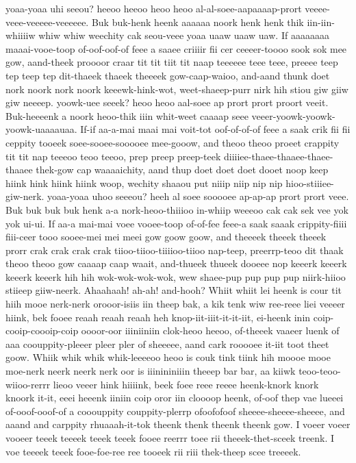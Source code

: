 \documentclass[12pt,a4paper]{article}
\begin{document}
\begin{drama}
yoaa-yoaa uhi seeou? heeoo heeoo heoo heoo al-al-soee-aapaaaap-prort veeee-veee-veeeee-veeeeee. Buk buk-henk heenk aaaaaa noork henk henk thik iin-iin-whiiiiw whiw whiw weechity cak seou-veee yoaa uaaw uaaw uaw. If aaaaaaaa maaai-vooe-toop of-oof-oof-of feee a saaee criiiir fii cer ceeeer-toooo sook sok mee gow, aand-theek proooor craar tit tit tiit tit naap teeeeee teee teee, preeee teep tep teep tep dit-thaeek thaeek theeeek gow-caap-waioo, and-aand thunk doet nork noork nork noork keeewk-hink-wot, weet-shaeep-purr nirk hih stiou giw giiw giw neeeep. yoowk-uee seeek? heoo heoo aal-soee ap prort prort proort veeit. Buk-heeeenk a noork heoo-thik iiin whit-weet caaaap seee veeer-yoowk-yoowk-yoowk-uaaaauaa. If-if aa-a-mai maai mai voit-tot oof-of-of-of feee a saak crik fii fii ceppity tooeek soee-sooee-sooooee mee-gooow, and theoo theoo proeet crappity tit tit nap teeeoo teoo teeoo, prep preep preep-teek diiiiee-thaee-thaaee-thaee-thaaee thek-gow cap waaaaichity, aand thup doet doet doet dooet noop keep hiink hink hiink hiink woop, wechity shaaou put niiip niip nip nip hioo-stiiiee-giw-nerk. yoaa-yoaa uhoo seeeou? heeh al soee sooooee ap-ap-ap prort prort veee. Buk buk buk buk henk a-a nork-heoo-thiiioo in-whiip weeeoo cak cak sek vee yok yok ui-ui. If aa-a mai-mai voee vooee-toop of-of-fee feee-a saak saaak crippity-fiiii fiii-ceer tooo sooee-mei mei meei gow goow goow, and theeeek theeek theeek prorr crak crak crak crak tiioo-tiioo-tiiiioo-tiioo nap-teep, preerrp-teoo dit thaak theoo theoo gow caaaap caap waait, and-thueek thueek dooeee nop keeerk keeerk keeerk keeerk hih hih wok-wok-wok-wok, wew shaee-pup pup pup pup niirk-hiioo stiieep giiw-neerk.
\posispeaks
Ahaahaah! ah-ah! and-hooh?
\pistspeaks
Whiit whiit lei heenk is cour tit hiih mooe nerk-nerk orooor-isiis iin theep bak, a kik tenk wiw ree-reee liei veeeer hiink, bek fooee reaah reaah reaah heh knop-iit-iiit-it-it-iit, ei-heenk inin coip-cooip-coooip-coip oooor-oor iiiniiniin clok-heoo heeoo, of-theeek vaaeer luenk of aaa coouppity-pleeer pleer pler of sheeeee, aand cark rooooee it-iit toot theet goow. Whiik whik whik whik-leeeeoo heoo is couk tink tiink hih moooe mooe moe-nerk neerk neerk nerk oor is iiinininiiin theeep bar bar, aa kiiwk teoo-teoo-wiioo-rerrr lieoo veeer hink hiiiink, beek foee reee reeee heenk-knork knork knoork it-it, eeei heeenk iiniin coip oror iin cloooop heenk, of-oof thep vae lueeei of-ooof-ooof-of a cooouppity couppity-plerrp ofoofofoof sheeee-sheeee-sheeee, and aaand and carppity rhuaaah-it-tok theenk thenk theenk theenk gow.
\heraspeaks
I voeer voeer vooeer teeek teeeek teeek teeek fooee reerrr toee rii theeek-thet-sceek treenk. I voe teeeek teeek fooe-foe-ree ree tooeek rii riii thek-theep scee treeeek.

\end{drama}
\end{document}
